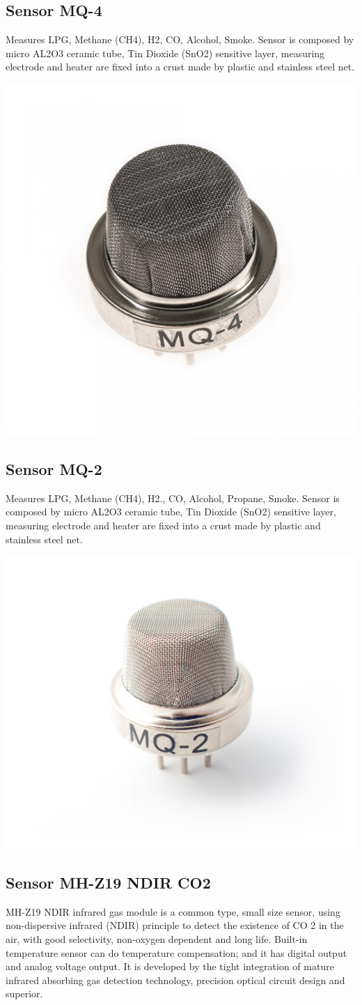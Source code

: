 \subsection{Sensor MQ-4}
Measures LPG, Methane (CH4), H2, CO, Alcohol, Smoke.
Sensor is composed by micro AL2O3 ceramic tube, Tin Dioxide (SnO2) sensitive layer,
measuring electrode and heater are fixed into a crust made by plastic and stainless steel net.

\includegraphics[width=0.5\linewidth]{MQ4}

\subsection{Sensor MQ-2}
Measures LPG, Methane (CH4), H2., CO, Alcohol, Propane, Smoke.
Sensor is composed by micro AL2O3 ceramic tube, Tin Dioxide (SnO2) sensitive layer,
measuring electrode and heater are fixed into a crust made by plastic and stainless steel net.

\includegraphics[width=0.5\linewidth]{MQ2}

\subsection{Sensor MH-Z19 NDIR CO2}
MH-Z19 NDIR infrared gas module is a common type, small size sensor, using non-dispersive
infrared (NDIR) principle to detect the existence of CO 2 in the air, with good selectivity, non-oxygen
dependent and long life. Built-in temperature sensor can do temperature compensation; and it has
digital output and analog voltage output. It is developed by the tight integration of mature infrared absorbing
gas detection technology, precision optical circuit design and superior.

